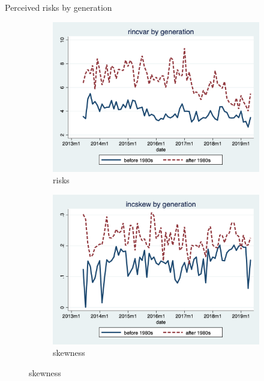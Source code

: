 \documentclass{beamer}
\begin{document}


\begin{frame}{Perceived risks by generation}
	\begin{figure}[ht]
		\label{ts_incvar_byear_g_mean}
		\begin{subfigure}[b]{0.46\textwidth}
			\centering
			\caption{risks}
			\includegraphics[width=\textwidth, height = 0.33\textheight]{figures/ts_rincvar_byear_g_median.png}
		\end{subfigure}
		\begin{subfigure}[b]{0.46\textwidth}
			\caption{skewness}
			\includegraphics[width=\textwidth, height = 0.33\textheight]{figures/ts_incskew_byear_g_median.png}
		\end{subfigure}
	\end{figure}
\end{frame}
\end{document}

